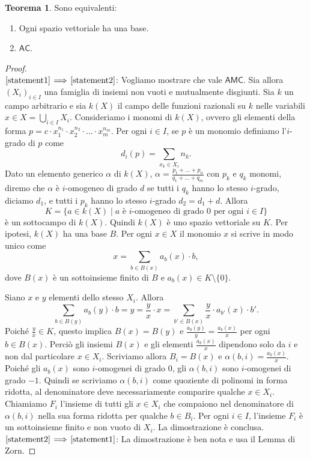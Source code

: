 \documentclass[12pt,a4paper]{report}
\theoremstyle{definition}
\newtheorem{teo}{Teorema}[section]  %
\theoremstyle{num.custom-title}
\DeclareMathOperator{\sm}{\setminus}
\newcommand{\AC}{\ensuremath{\mathsf{AC}}\xspace}
\newcommand{\AMC}{\ensuremath{\mathsf{AMC}}\xspace}
\newcommand{\Implies}[2]{$\text{\ref{statement#1}}\!\implies\!\text{\ref{statement#2}}$}%
\newcommand{\punto}[1]{\item \label{statement#1}}
\newenvironment{equivalence}
    {\begin{enumerate}[label=(\arabic*),ref=(\arabic*)]
    }
    { 
	\end{enumerate}
    }
\begin{document}
\begin{teo} Sono equivalenti:
\begin{equivalence}
\punto{1} Ogni spazio vettoriale ha una base.
\punto{2} \AC.
\end{equivalence}
\begin{proof}\ \\
\Implies{1}{2}: Vogliamo mostrare che vale \AMC. Sia allora $(X_i)_{i \in I}$ una famiglia di insiemi non vuoti e mutualmente disgiunti. Sia $k$ un campo arbitrario e sia $k(X)$ il campo delle funzioni razionali su $k$ nelle variabili $x \in X = \bigcup_{i \in I} X_i$. Consideriamo i monomi di $k(X)$, ovvero gli elementi della forma $p=c \cdot x_1^{n_1} \cdot x_2^{n_2} \cdot ... \cdot x_m^{n_m}$. Per ogni $i \in I$, se $p$ è un monomio definiamo l'$i$-grado di $p$ come 
\[
d_i(p)= \sum_{x_k \in X_i} n_k.
\]
Dato un elemento generico $\alpha$ di $k(X)$, $\alpha= \frac{p_1+...+p_n}{q_1+...+q_m}$ con $p_k$ e $q_k$ monomi, diremo che $\alpha$ è $i$-omogeneo di grado $d$ se tutti i $q_k$ hanno lo stesso $i$-grado, diciamo $d_1$, e tutti i $p_k$ hanno lo stesso $i$-grado $d_2=d_1+d$. Allora 
\[
K=\{a \in k(X) \mid a \text{ è $i$-omogeneo di grado $0$ per ogni } i \in I\}
\]
è un sottocampo di $k(X)$. Quindi $k(X)$ è uno spazio vettoriale su $K$. Per ipotesi, $k(X)$ ha una base $B$. Per ogni $x \in X$ il monomio $x$ si scrive in modo unico come
\[
x=\sum_{b \in B(x)} a_b(x) \cdot b,
\]
dove $B(x)$ è un sottoinsieme finito di $B$ e $a_b(x) \in K \sm \{0\}$.

Siano $x$ e $y$ elementi dello stesso $X_i$. Allora
\[
\sum_{b \in B(y)} a_b(y) \cdot b = y =\frac{y}{x} \cdot x = \sum_{b' \in B(x)} \frac{y}{x} \cdot a_{b'}(x) \cdot b'. 
\]
Poiché $\frac{y}{x} \in K$, questo implica $B(x)=B(y)$ e $\frac{a_b(y)}{y}=\frac{a_b(x)}{x}$ per ogni $b \in B(x)$. Perciò gli insiemi $B(x)$ e gli elementi $\frac{a_b(x)}{x}$ dipendono solo da $i$ e non dal particolare $x \in X_i$. Scriviamo allora $B_i=B(x)$ e $\alpha(b,i)=\frac{a_b(x)}{x}$. Poiché gli $a_b(x)$ sono $i$-omogenei di grado $0$, gli $\alpha(b,i)$ sono $i$-omogenei di grado $-1$. Quindi se scriviamo $\alpha(b,i)$ come quoziente di polinomi in forma ridotta, al denominatore deve necessariamente comparire qualche $x \in X_i$. Chiamiamo $F_i$ l'insieme di tutti gli $x \in X_i$ che compaiono nel denominatore di $\alpha(b,i)$ nella sua forma ridotta per qualche $b \in B_i$. Per ogni $i \in I$, l'insieme $F_i$ è un sottoinsieme finito e non vuoto di $X_i$. La dimostrazione è conclusa.
\Implies{2}{1}: La dimostrazione è ben nota e usa il Lemma di Zorn.
\end{proof}
\end{teo}
\end{document}
